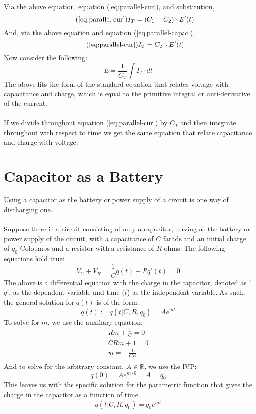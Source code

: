 \documentclass{article}
\begin{document}
	Via the above equation, equation (\ref{eq:parallel-cur}), and substitution,
	\begin{equation}\tag{\ref{eq:parallel-cur}}
		I_T = (C_1  + C_2) \cdot E'(t)
	\end{equation}
	And, via the above equation and equation (\ref{eq:parallel-capac}),
	\begin{equation}\tag{\ref{eq:parallel-cur}}
		I_T = C_T \cdot E'(t)
	\end{equation}
	Now consider the following:
	\[ E = \frac{1}{C_T} \int I_T \cdot dt\]
	The above fits the form of the standard equation that relates voltage with 
	capacitance and charge, which is equal to the primitive integral or 
	anti-derivative of the current. \\ \\
	If we divide throughout equation (\ref{eq:parallel-cur}) by $C_T$ and then 
	integrate throughout with respect to time we get the same equation that 
	relate capacitance and charge with voltage.
	\section[Discharge]{Capacitor as a Battery}
	Using a capacitor as the battery or power supply of a circuit is one way of 
	discharging one.  \\ \\
	Suppose there is a circuit consisting of only a capacitor, serving as the 
	battery or power supply of the circuit, with a capacitance of $C$ 
	farads and an initial charge of $q_0$ Coloumbs and a resistor with a 
	resistance of $R$ ohms.  The following equations hold true:
	\[ V_C + V_R = \frac{1}{C}q(t) + Rq'(t) = 0\]
	The above is a differential equation with the charge in the capacitor, 
	denoted as '$q$', as the dependent variable and time ($t$) as the 
	independent variable.  As such, the general solution for $q(t)$ is of the 
	form:
	\[ q(t) := q(t \vert C, R, q_0) = Ae^{mt}\]
	To solve for $m$, we use the auxiliary equation:
	\begin{gather*}
	    Rm + \frac{1}{C} = 0\\
	    CRm + 1 = 0\\
	    m = - \frac{1}{CR}\\
	\end{gather*}
	And to solve for the arbitrary constant, $A \in \mathbb{R}$, we use the IVP:
	\[ q(0) = Ae^{m \cdot 0} = A = q_0\]
	This leaves us with the specific solution for the parametric function that 
	gives the charge in the capacitor as a function of time.
	\[ q(t \vert C, R, q_0) = q_0e^{mt}\]
\end{document}
